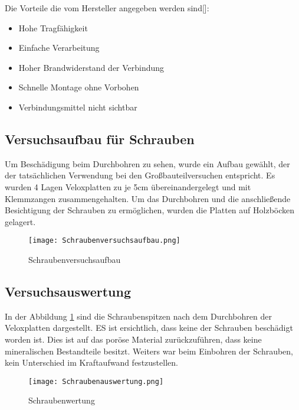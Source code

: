 \documentclass[12 pt,a4 paper ]{scrreprt}
\begin{document}
Die Vorteile die vom Hersteller angegeben werden sind[]:

\begin{itemize}
	\item Hohe Tragfähigkeit
	\item Einfache Verarbeitung
	\item Hoher Brandwiderstand der Verbindung
	\item Schnelle Montage ohne Vorbohen
	\item Verbindungsmittel nicht sichtbar
\end{itemize}

\subsection{Versuchsaufbau für Schrauben}

Um Beschädigung beim Durchbohren zu sehen, wurde ein Aufbau gewählt, der der tatsächlichen Verwendung bei den Großbauteilversuchen entspricht. Es wurden 4 Lagen Veloxplatten zu je 5cm übereinandergelegt und mit Klemmzangen zusammengehalten. Um das Durchbohren und die anschließende Besichtigung der Schrauben zu ermöglichen, wurden die Platten auf Holzböcken gelagert.  

\begin{figure}
\begin{center}
\texttt{[image: Schraubenversuchsaufbau.png]}
\caption{ Schraubenversuchsaufbau}
\end{center}
\end{figure}

\subsection{Versuchsauswertung}

In der Abbildung \ref{Schraubenauswertung} sind die Schraubenspitzen nach dem Durchbohren der Veloxplatten dargestellt. ES ist ersichtlich, dass keine der Schrauben beschädigt worden ist. Dies ist auf das poröse Material zurückzuführen, dass keine mineralischen Bestandteile besitzt. Weiters war beim Einbohren der Schrauben, kein Unterschied im Kraftaufwand festzustellen. 

\begin{figure}[h!]
\begin{center}
\texttt{[image: Schraubenauswertung.png]}
\caption{ Schraubenwertung}
\label{Schraubenauswertung}
\end{center}
\end{figure}
\end{document}
